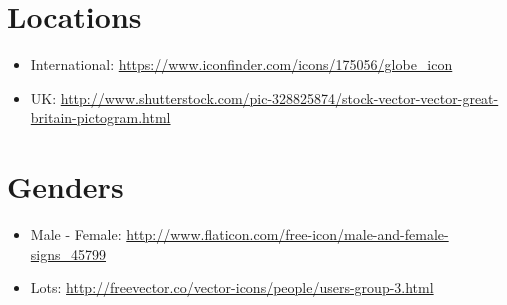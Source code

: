 \documentclass{mproj}
\begin{document}
\section{Locations}

\begin{itemize}
	\item International: \url{https://www.iconfinder.com/icons/175056/globe_icon}
	\item UK: \url{http://www.shutterstock.com/pic-328825874/stock-vector-vector-great-britain-pictogram.html}
\end{itemize}

\section{Genders}

\begin{itemize}
	\item Male - Female: \url{http://www.flaticon.com/free-icon/male-and-female-signs_45799}
	\item Lots: \url{http://freevector.co/vector-icons/people/users-group-3.html}
\end{itemize}
\end{document}
